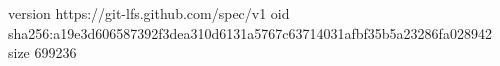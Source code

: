 version https://git-lfs.github.com/spec/v1
oid sha256:a19e3d606587392f3dea310d6131a5767c63714031afbf35b5a23286fa028942
size 699236

